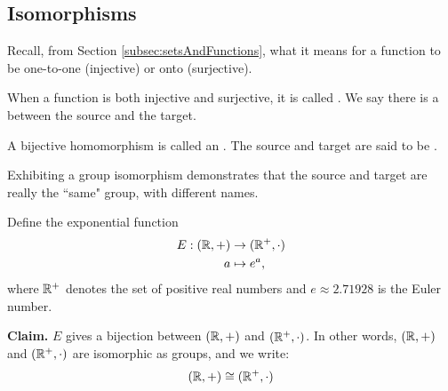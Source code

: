 \documentclass[../algebraNotesMSRI-UP2016.tex]{subfiles}
\begin{document}
\subsection[\subsecname]{Isomorphisms}\label{subsec:isomorphisms}
\begin{frame}{\subsecname}
Recall, from Section \ref{subsec:setsAndFunctions}, what it means for a function to be one-to-one (injective) or onto (surjective).

\smallGap
When a function is both injective and surjective, it is called .  We say there is a  between the source and the target.

\smallGap  
\begin{dfn}
A bijective homomorphism is called an .  The source and target are said to be .
\end{dfn}

\smallGap
Exhibiting a group isomorphism demonstrates that the source and target are really the ``same" group, with different names.
\end{frame}

\begin{frame}
\begin{ex}\label{ex:exponentialFunction}
Define the exponential function
\begin{align*}
E:(\mathbb R,+) &\to (\mathbb R^+,\cdot) \\
a &\mapsto e^a,
\end{align*}
where $\mathbb R^+$ denotes the set of positive real numbers and $e\approx 2.71928$ is the Euler number.  
\end{ex}

\smallGap
\textbf{Claim.} $E$ gives a bijection between $(\mathbb R,+)$ and $(\mathbb R^+,\cdot)$.  In other words, $(\mathbb R,+)$ and $(\mathbb R^+,\cdot)$ are isomorphic as groups, and we write: 
\[
(\mathbb R,+)\cong (\mathbb R^+,\cdot)
\]
\end{frame}
\end{document}
